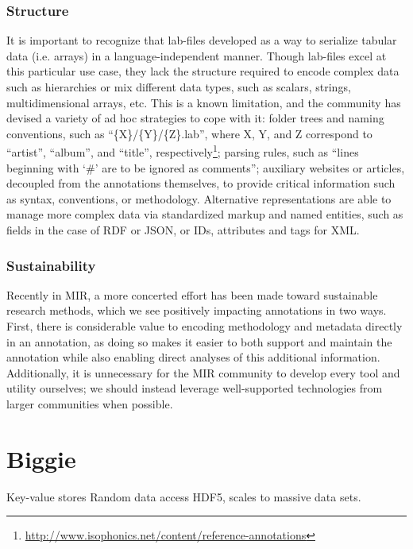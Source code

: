 \subsubsection{Structure}
\label{subsubsec:structure}
It is important to recognize that lab-files developed as a way to serialize tabular data (i.e. arrays) in a language-independent manner.
Though lab-files excel at this particular use case, they lack the structure required to encode complex data such as hierarchies or mix different data types, such as scalars, strings, multidimensional arrays, etc.
This is a known limitation, and the community has devised a variety of ad hoc strategies to cope with it: folder trees and naming conventions, such as ``\{X\}/\{Y\}/\{Z\}.lab'', where X, Y, and Z correspond to ``artist'', ``album'', and ``title'', respectively\footnote{\url{http://www.isophonics.net/content/reference-annotations}}; parsing rules, such as ``lines beginning with `\#' are to be ignored as comments''; auxiliary websites or articles, decoupled from the annotations themselves, to provide critical information such as syntax, conventions, or methodology.
Alternative representations are able to manage more complex data via standardized markup and named entities, such as fields in the case of RDF or JSON, or IDs, attributes and tags for XML.

\subsubsection{Sustainability}
\label{subsubsec:sustainability}

Recently in MIR, a more concerted effort has been made toward sustainable research methods, which we see positively impacting annotations in two ways.
First, there is considerable value to encoding methodology and metadata directly in an annotation, as doing so makes it easier to both support and maintain the annotation while also enabling direct analyses of this additional information.
Additionally, it is unnecessary for the MIR community to develop every tool and utility ourselves; we should instead leverage well-supported technologies from larger communities when possible.


\section{Biggie}
\label{sec:optimus}

Key-value stores
Random data access
HDF5, scales to massive data sets.

